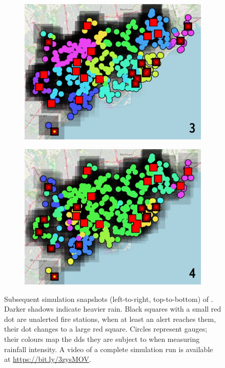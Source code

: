 \begin{figure}[t]
\begin{subfigure}[b]{0.39\linewidth}
    \includegraphics[width=\linewidth]{papers/ieee2022/img/snapshots/step-5.png-low.png}
  \end{subfigure}
  \hfill
  \begin{subfigure}[b]{0.39\linewidth}
    \centering
    \includegraphics[width=\linewidth]{papers/ieee2022/img/snapshots/step-6.png-low.png}
  \end{subfigure}
  \caption[\casename{} simulation snapshots]{
    Subsequent simulation snapshots (left-to-right, top-to-bottom) of \casename{}.
    Darker shadows indicate heavier rain.
    Black squares with a small red dot are unalerted fire stations,
    when at least an alert reaches them, their dot changes to a large red square.
    Circles represent gauges;
    their colours map the \acp{dd} they are subject to when measuring rainfall intensity.
    A video of a complete simulation run is available at \url{https://bit.ly/3zysMOV}.
  }
  \label{fig:simulation-plots}
\end{figure}

